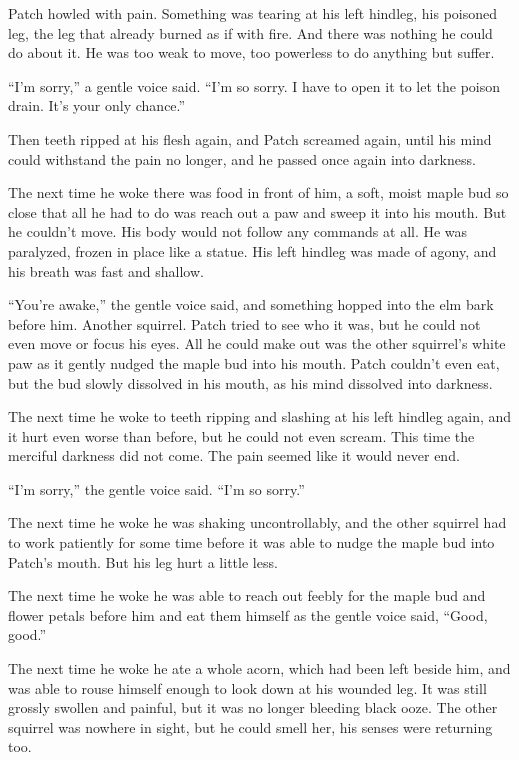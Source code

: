 \documentclass[12pt]{memoir}
\begin{document}
Patch howled with pain. Something was tearing at his left hindleg, his
poisoned leg, the leg that already burned as if with fire. And there
was nothing he could do about it. He was too weak to move, too
powerless to do anything but suffer.

“I’m sorry,” a gentle voice said. “I’m so sorry. I have to open it to
let the poison drain. It’s your only chance.”

Then teeth ripped at his flesh again, and Patch screamed again, until
his mind could withstand the pain no longer, and he passed once again
into darkness.

The next time he woke there was food in front of him, a soft, moist
maple bud so close that all he had to do was reach out a paw and sweep
it into his mouth. But he couldn’t move. His body would not follow any
commands at all. He was paralyzed, frozen in place like a statue. His
left hindleg was made of agony, and his breath was fast and shallow.

“You’re awake,” the gentle voice said, and something hopped into the
elm bark before him. Another squirrel. Patch tried to see who it was,
but he could not even move or focus his eyes. All he could make out
was the other squirrel’s white paw as it gently nudged the maple bud
into his mouth. Patch couldn’t even eat, but the bud slowly dissolved
in his mouth, as his mind dissolved into darkness.

The next time he woke to teeth ripping and slashing at his left
hindleg again, and it hurt even worse than before, but he could not
even scream. This time the merciful darkness did not come. The pain
seemed like it would never end.

“I’m sorry,” the gentle voice said. “I’m so sorry.”

The next time he woke he was shaking uncontrollably, and the other
squirrel had to work patiently for some time before it was able to
nudge the maple bud into Patch’s mouth. But his leg hurt a little
less.

The next time he woke he was able to reach out feebly for the maple
bud and flower petals before him and eat them himself as the gentle
voice said, “Good, good.”

The next time he woke he ate a whole acorn, which had been left beside
him, and was able to rouse himself enough to look down at his wounded
leg. It was still grossly swollen and painful, but it was no longer
bleeding black ooze. The other squirrel was nowhere in sight, but he
could smell her, his senses were returning too.
\end{document}
